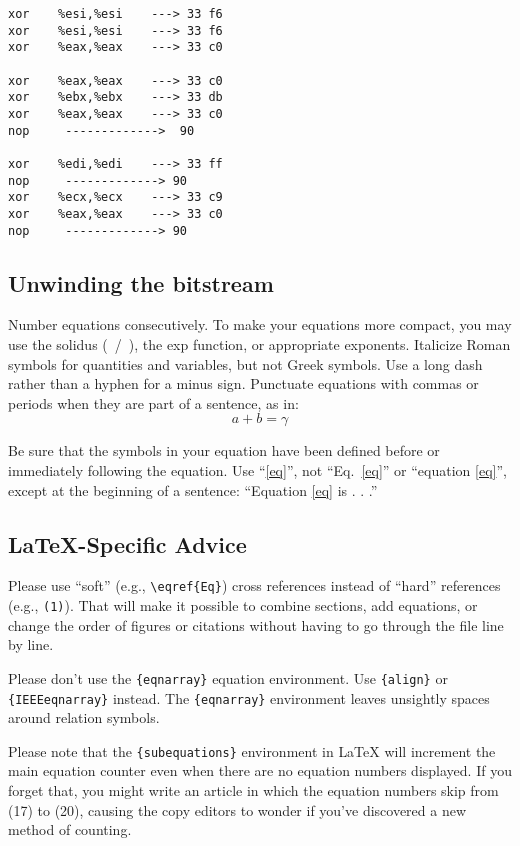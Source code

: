 \documentclass[conference]{IEEEtran}
\begin{document}
\begin{lstlisting}[style=asm]
xor    %esi,%esi    ---> 33 f6
xor    %esi,%esi    ---> 33 f6
xor    %eax,%eax    ---> 33 c0

xor    %eax,%eax    ---> 33 c0
xor    %ebx,%ebx    ---> 33 db 
xor    %eax,%eax    ---> 33 c0
nop     ------------->  90

xor    %edi,%edi    ---> 33 ff
nop     -------------> 90
xor    %ecx,%ecx    ---> 33 c9
xor    %eax,%eax    ---> 33 c0
nop     -------------> 90
\end{lstlisting}





\subsection{Unwinding the bitstream}



Number equations consecutively. To make your
equations more compact, you may use the solidus (~/~), the exp function, or
appropriate exponents. Italicize Roman symbols for quantities and variables,
but not Greek symbols. Use a long dash rather than a hyphen for a minus
sign. Punctuate equations with commas or periods when they are part of a
sentence, as in:
\begin{equation}
a+b=\gamma\label{eq}
\end{equation}

Be sure that the
symbols in your equation have been defined before or immediately following
the equation. Use ``\eqref{eq}'', not ``Eq.~\eqref{eq}'' or ``equation \eqref{eq}'', except at
the beginning of a sentence: ``Equation \eqref{eq} is . . .''

\subsection{\LaTeX-Specific Advice}

Please use ``soft'' (e.g., \verb|\eqref{Eq}|) cross references instead
of ``hard'' references (e.g., \verb|(1)|). That will make it possible
to combine sections, add equations, or change the order of figures or
citations without having to go through the file line by line.

Please don't use the \verb|{eqnarray}| equation environment. Use
\verb|{align}| or \verb|{IEEEeqnarray}| instead. The \verb|{eqnarray}|
environment leaves unsightly spaces around relation symbols.

Please note that the \verb|{subequations}| environment in {\LaTeX}
will increment the main equation counter even when there are no
equation numbers displayed. If you forget that, you might write an
article in which the equation numbers skip from (17) to (20), causing
the copy editors to wonder if you've discovered a new method of
counting.
\end{document}
